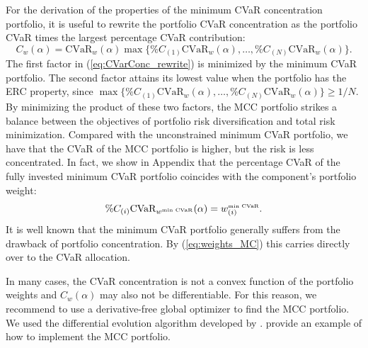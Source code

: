 \documentclass[12pt,a4paper]{article}
\begin{document}
For the derivation of the properties of the minimum CVaR concentration portfolio, it is useful to rewrite the portfolio CVaR concentration as the portfolio CVaR times the largest percentage CVaR contribution:
\begin{equation} C_w(\alpha) = \mbox{CVaR}_w(\alpha) \max \{ \%C_{(1)}\mbox{CVaR}_w(\alpha) , \ldots ,  \%C_{(N)}\mbox{CVaR}_w(\alpha)\}. \label{eq:CVarConc_rewrite}\end{equation}
The first factor in (\ref{eq:CVarConc_rewrite}) is minimized by the minimum CVaR portfolio.  The second factor attains its lowest value when the portfolio has the ERC property, since $\max \{ \%C_{(1)}\mbox{CVaR}_w(\alpha) , \ldots ,  \%C_{(N)}\mbox{CVaR}_w(\alpha)\} \geq 1/N.$  By minimizing the product of these two factors, the MCC portfolio strikes a balance between the objectives of portfolio risk diversification and total risk minimization. Compared with the unconstrained minimum CVaR portfolio, we have that the CVaR of the MCC portfolio is higher, but the risk is less concentrated. In fact, we show in Appendix that the percentage CVaR of the fully invested minimum CVaR portfolio coincides with the component's portfolio weight:
\begin{equation} \%C_{(i)} \mbox{CVaR}_{w^{\mbox{\tiny min CVaR}}}(\alpha) = w^{\mbox{\tiny min CVaR}}_{(i)}. \label{eq:weights_MC}\end{equation}
It is well known that the minimum CVaR portfolio generally suffers from the drawback of portfolio concentration. By (\ref{eq:weights_MC}) this carries directly over to the CVaR allocation.

In many cases, the CVaR concentration is not a convex function of the portfolio weights and $C_w(\alpha)$ may also not be differentiable. For this reason, we recommend to use a derivative-free global optimizer to find the MCC portfolio. We used the differential evolution algorithm developed by \citet{Price2005}. \citet{Ardia2010} provide an example of how to implement the MCC portfolio.

\end{document}
